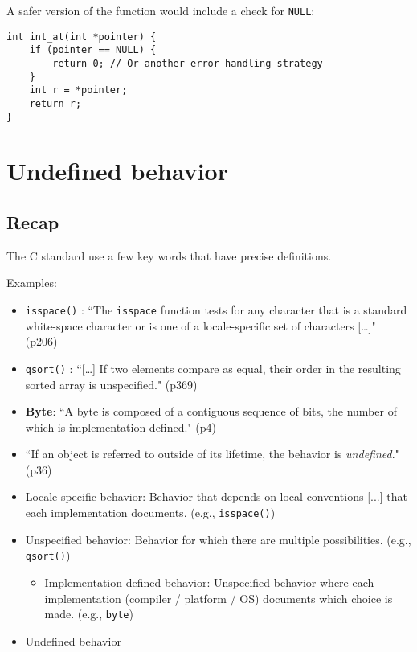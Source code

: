 \documentclass[12pt]{article}
\begin{document}
A safer version of the function would include a check for \texttt{NULL}:

\begin{verbatim}
int int_at(int *pointer) {
    if (pointer == NULL) {
        return 0; // Or another error-handling strategy
    }
    int r = *pointer;
    return r;
}
\end{verbatim}






















\newpage
\section{Undefined behavior}

\subsection{Recap}
The C standard use a few key words that have precise definitions.

Examples:
\begin{itemize}
    \item \texttt{isspace()} : ``The \texttt{isspace} function tests for any character that is a standard white-space character or is one of a locale-specific set of characters [\ldots]" (p206)
    \item \texttt{qsort()} : ``[\ldots] If two elements compare as equal, their order in the resulting sorted array is unspecified." (p369)
    \item \textbf{Byte}: ``A byte is composed of a contiguous sequence of bits, the number of which is implementation-defined." (p4)
    \item ``If an object is referred to outside of its lifetime, the behavior is \emph{undefined}." (p36)
  \item Locale-specific behavior: Behavior that depends on local conventions [...] that each implementation documents. (e.g., \texttt{isspace()})
  
  \item Unspecified behavior: Behavior for which there are multiple possibilities. (e.g., \texttt{qsort()})
  
  \begin{itemize}
    \item Implementation-defined behavior: Unspecified behavior where each implementation (compiler / platform / OS) documents which choice is made. (e.g., \texttt{byte})
  \end{itemize}
  
  \item Undefined behavior
\end{itemize}
\end{document}
